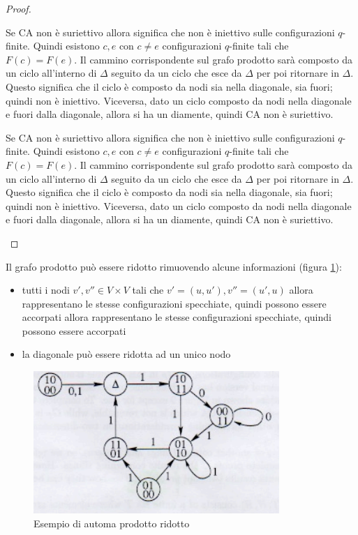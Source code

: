 \begin{teorema}
\begin{proof}
\begin{itemize}
                  Se CA non è suriettivo allora significa che non è iniettivo sulle
                  configurazioni $q$-finite. Quindi esistono $c,e$ con $c\ne e $ configurazioni
                  $q$-finite tali che $F(c) =F(e)$. Il cammino corrispondente sul
                  grafo prodotto sarà composto da un ciclo all'interno di $\Delta$
                  seguito da un ciclo che esce da $\Delta$ per poi ritornare in $\Delta$.
                  Questo significa che il ciclo è composto da nodi sia nella diagonale,
                  sia fuori; quindi non è iniettivo. Viceversa, dato un ciclo composto da nodi nella diagonale
                  e fuori dalla diagonale, allora si ha un diamente, quindi CA non è suriettivo.

                  Se CA non è suriettivo allora significa che non è iniettivo sulle
                  configurazioni $q$-finite. Quindi esistono $c,e$ con $c\ne e $ configurazioni
                  $q$-finite tali che $F(c) =F(e)$. Il cammino corrispondente sul
                  grafo prodotto sarà composto da un ciclo all'interno di $\Delta$
                  seguito da un ciclo che esce da $\Delta$ per poi ritornare in $\Delta$.
                  Questo significa che il ciclo è composto da nodi sia nella diagonale,
                  sia fuori; quindi non è iniettivo. Viceversa, dato un ciclo composto da nodi nella diagonale
                  e fuori dalla diagonale, allora si ha un diamente, quindi CA non è suriettivo.

        \end{itemize}
    \end{proof}
\end{teorema}
Il grafo prodotto può essere ridotto rimuovendo alcune informazioni (figura \ref{fig:automa_prodotto_ridotto}):
\begin{itemize}
    \item tutti i nodi $v',v'' \in V\times V$ tali che $v'= (u,u'), v''=(u',u)$
          allora rappresentano le stesse configurazioni specchiate, quindi possono essere
          accorpati
          allora rappresentano le stesse configurazioni specchiate, quindi possono essere
          accorpati
    \item la diagonale può essere ridotta ad un unico nodo
\end{itemize}

\begin{figure}[!h]
    \centering
    \includegraphics[width=.7\textwidth]{img/sistemi_complessi/automa_prodotto_ridotto.png}
    \caption{Esempio di automa prodotto ridotto}
    \label{fig:automa_prodotto_ridotto}
\end{figure}

